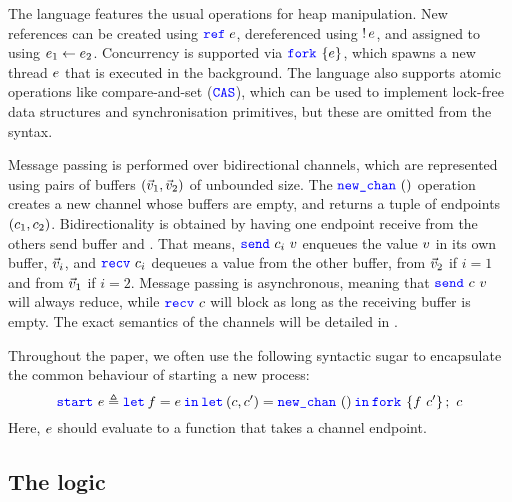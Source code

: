 The language features the usual operations for heap manipulation.
New references can be created using $\texttt{\color{blue} ref}\;{e}$, dereferenced using $\mathop{!} e$,
and assigned to using $e_1 \leftarrow e_2$.
Concurrency is supported via $\Fork \expr$, which spawns a new thread $e$
that is executed in the background.
The language also supports atomic operations like compare-and-set ($\texttt{\color{blue} CAS}$), which can be
used to implement lock-free data structures and
synchronisation primitives, but these are omitted from the syntax.

Message passing is performed over bidirectional channels, which are
represented using pairs of buffers $(\vec{v}_1,\vec{v}_2)$
of unbounded size.
The $\texttt{\color{blue} new\_chan}\ ()$ operation creates a new channel
whose buffers are empty, and returns a tuple of endpoints $(c_1,c_2)$.
Bidirectionality is obtained by having one endpoint receive from the others
send buffer and \viceversa.
That means, $\texttt{\color{blue} send}\ c_i\ v$ enqueues the value $v$ in its own
buffer, \ie $\vec{v}_i$,
and $\texttt{\color{blue} recv}\ c_i$ dequeues a value from the other buffer, \ie from
$\vec{v}_{2}$ if $i=1$ and from $\vec{v}_{1}$ if $i=2$.
Message passing is asynchronous, meaning that $\texttt{\color{blue} send}\ c\ v$ will always
reduce, while $\texttt{\color{blue} recv}\ c$ will block as long as the receiving buffer is empty.
The exact semantics of the channels will be detailed in
.

Throughout the paper, we often use the following syntactic sugar to encapsulate
the common behaviour of starting a new process:
\[
\start{\expr}
  \eqdef
  \Let f = \expr in \Let{(\chan,\chan')} = \newchan in \Fork{f\ \chan'};\ \chan
\]
Here, $e$ should evaluate to a function that takes a channel endpoint.

\subsection{The \lname logic}
\label{sec:logic}

